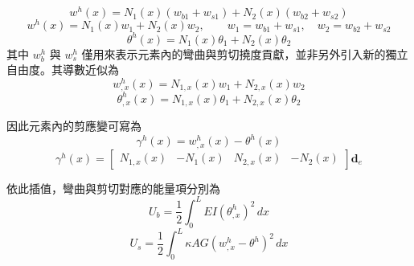 ﻿\documentclass[UTF8, a4paper, 12pt]{ctexart}
\begin{document}
\begin{equation}
  w^h(x)=N_1(x)(w_{b1}+w_{s1})+N_2(x)(w_{b2}+w_{s2})
\end{equation}
\begin{equation}
  w^h(x)=N_1(x)w_1+N_2(x)w_2,\qquad
  w_1=w_{b1}+w_{s1},\quad w_2=w_{b2}+w_{s2}
\end{equation}
\begin{equation}
  \theta^h(x)=N_1(x)\theta_1+N_2(x)\theta_2
\end{equation}
其中 $w_b^h$ 與 $w_s^h$ 僅用來表示元素內的彎曲與剪切撓度貢獻，並非另外引入新的獨立自由度。其導數近似為
\begin{equation}
  w^h_{,x}(x)=N_{1,x}(x)w_1+N_{2,x}(x)w_2
\end{equation}
\begin{equation}
  \theta^h_{,x}(x)=N_{1,x}(x)\theta_1+N_{2,x}(x)\theta_2
\end{equation}

因此元素內的剪應變可寫為
\begin{equation}
  \gamma^h(x)=w^h_{,x}(x)-\theta^h(x)
\end{equation}
\begin{equation}
  \gamma^h(x)=
  \begin{bmatrix}
    N_{1,x}(x) & -N_1(x) & N_{2,x}(x) & -N_2(x)
  \end{bmatrix}
  \mathbf{d}_e
\end{equation}

依此插值，彎曲與剪切對應的能量項分別為
\begin{equation}
  U_b=\frac{1}{2}\int_0^L EI\left(\theta^h_{,x}\right)^2\,dx
\end{equation}
\begin{equation}
  U_s=\frac{1}{2}\int_0^L \kappa AG\left(w^h_{,x}-\theta^h\right)^2\,dx
\end{equation}
\end{document}
